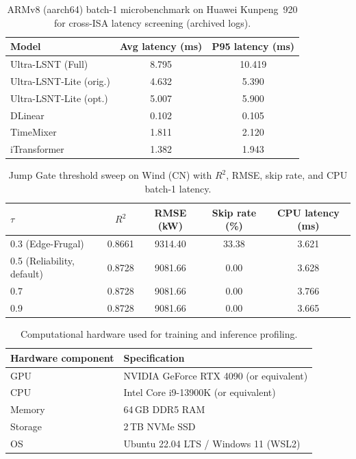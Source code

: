 ﻿\documentclass[review,1p,times]{elsarticle}
\begin{document}
\begin{table}[t]
\centering
\caption{ARMv8 (aarch64) batch-1 microbenchmark on Huawei Kunpeng~920 for cross-ISA latency screening (archived logs).}
\label{tab:arm_microbenchmark}
\begin{tabular}{lcc}
\toprule
Model & Avg latency (ms) & P95 latency (ms) \\
\midrule
Ultra-LSNT (Full) & 8.795 & 10.419 \\
Ultra-LSNT-Lite (orig.) & 4.632 & 5.390 \\
Ultra-LSNT-Lite (opt.) & 5.007 & 5.900 \\
DLinear & 0.102 & 0.105 \\
TimeMixer & 1.811 & 2.120 \\
iTransformer & 1.382 & 1.943 \\
\bottomrule
\end{tabular}
\end{table}

\begin{table}[t]
\centering
\caption{Jump Gate threshold sweep on Wind (CN) with $R^2$, RMSE, skip rate, and CPU batch-1 latency.}
\label{tab:tau_sweep_pareto}
\begin{tabular}{lcccc}
\toprule
$\tau$ & $R^2$ & RMSE (kW) & Skip rate (\%) & CPU latency (ms) \\
\midrule
0.3 (Edge-Frugal) & 0.8661 & 9314.40 & 33.38 & 3.621 \\
0.5 (Reliability, default) & 0.8728 & 9081.66 & 0.00 & 3.628 \\
0.7 & 0.8728 & 9081.66 & 0.00 & 3.766 \\
0.9 & 0.8728 & 9081.66 & 0.00 & 3.665 \\
\bottomrule
\end{tabular}
\end{table}

\begin{table}[t]
\centering
\caption{Computational hardware used for training and inference profiling.}
\label{tab:impl_hardware}
\begin{tabular}{ll}
\toprule
Hardware component & Specification \\
\midrule
GPU & NVIDIA GeForce RTX 4090 (or equivalent) \\
CPU & Intel Core i9-13900K (or equivalent) \\
Memory & 64\,GB DDR5 RAM \\
Storage & 2\,TB NVMe SSD \\
OS & Ubuntu 22.04 LTS / Windows 11 (WSL2) \\
\bottomrule
\end{tabular}
\end{table}
\end{document}
